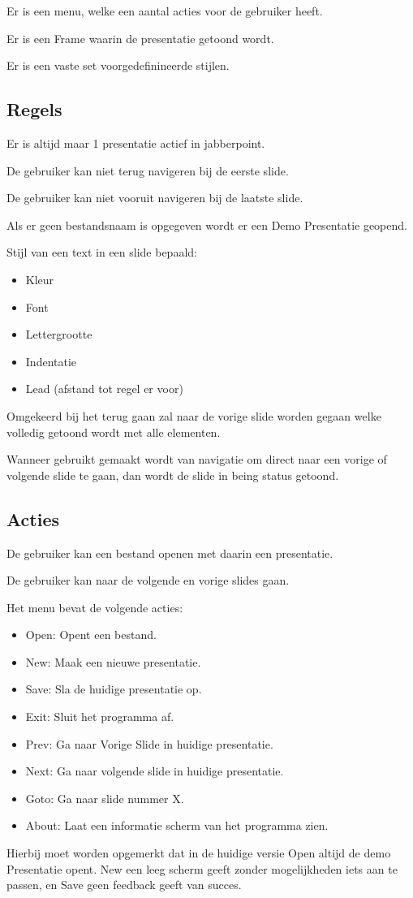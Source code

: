 \documentclass[a4paper]{article}
\begin{document}
Er is een menu, welke een aantal acties voor de gebruiker heeft.

Er is een Frame waarin de presentatie getoond wordt.

Er is een vaste set voorgedefinineerde stijlen.

\subsection{Regels}
Er is altijd maar 1 presentatie actief in jabberpoint.

De gebruiker kan niet terug navigeren bij de eerste slide.

De gebruiker kan niet vooruit navigeren bij de laatste slide.

Als er geen bestandsnaam is opgegeven wordt er een Demo Presentatie geopend.

Stijl van een text in een slide bepaald:
\begin{itemize}
    \item Kleur
    \item Font
    \item Lettergrootte
    \item Indentatie
    \item Lead (afstand tot regel er voor)
\end{itemize}

Omgekeerd bij het terug gaan zal naar de vorige slide worden gegaan welke
volledig getoond wordt met alle elementen.

Wanneer gebruikt gemaakt wordt van navigatie om direct naar een vorige of
volgende slide te gaan, dan wordt de slide in being status getoond.

\subsection{Acties}
De gebruiker kan een bestand openen met daarin een presentatie.

De gebruiker kan naar de volgende en vorige slides gaan.

Het menu bevat de volgende acties:
\begin{itemize}
    \item Open: Opent een bestand.
    \item New: Maak een nieuwe presentatie.
    \item Save: Sla de huidige presentatie op.
    \item Exit: Sluit het programma af.
    \item Prev: Ga naar Vorige Slide in huidige presentatie.
    \item Next: Ga naar volgende slide in huidige presentatie.
    \item Goto: Ga naar slide nummer X.
    \item About: Laat een informatie scherm van het programma zien.
\end{itemize}
Hierbij moet worden opgemerkt dat in de huidige versie Open altijd de demo
Presentatie opent. New een leeg scherm geeft zonder mogelijkheden iets aan te
passen, en Save geen feedback geeft van succes.
\end{document}
